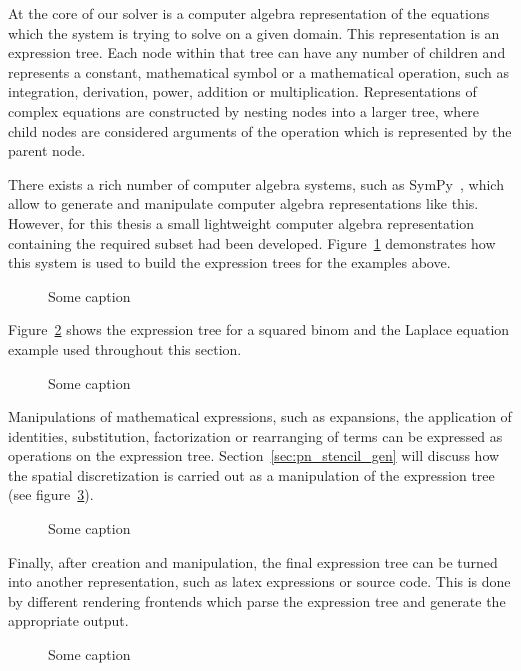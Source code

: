 At the core of our solver is a computer algebra representation of the equations which the system is trying to solve on a given domain. This representation is an expression tree. Each node within that tree can have any number of children and represents a constant, mathematical symbol or a mathematical operation, such as integration, derivation, power, addition or multiplication. Representations of complex equations are constructed by nesting nodes into a larger tree, where child nodes are considered arguments of the operation which is represented by the parent node.

There exists a rich number of computer algebra systems, such as SymPy~\cite{Meurer17}, which allow to generate and manipulate computer algebra representations like this. However, for this thesis a small lightweight computer algebra representation containing the required subset had been developed. Figure~\ref{fig:pn_math_expression_tree_generation} demonstrates how this system is used to build the expression trees for the examples above.
\begin{figure}[h]
\centering
{}
\caption{Some caption}
\label{fig:pn_math_expression_tree_generation}
\end{figure}

Figure~\ref{fig:pn_math_expression_tree} shows the expression tree for a squared binom and the Laplace equation example used throughout this section.
\begin{figure}[h]
\centering
{}
\caption{Some caption}
\label{fig:pn_math_expression_tree}
\end{figure}

Manipulations of mathematical expressions, such as expansions, the application of identities, substitution, factorization or rearranging of terms can be expressed as operations on the expression tree. Section~\ref{sec:pn_stencil_gen} will discuss how the spatial discretization is carried out as a manipulation of the expression tree (see figure~\ref{fig:pn_math_expression_tree_manipulation}).
\begin{figure}[h]
\centering
{}
\caption{Some caption}
\label{fig:pn_math_expression_tree_manipulation}
\end{figure}

Finally, after creation and manipulation, the final expression tree can be turned into another representation, such as latex expressions or source code. This is done by different rendering frontends which parse the expression tree and generate the appropriate output.
\begin{figure}[h]
\centering
{}
\caption{Some caption}
\label{fig:pn_math_expression_tree_rendering}
\end{figure}

